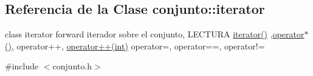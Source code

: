 \hypertarget{classconjunto_1_1iterator}{\subsection{Referencia de la Clase conjunto\-:\-:iterator}
\label{classconjunto_1_1iterator}
}


class iterator forward iterador sobre el conjunto, L\-E\-C\-T\-U\-R\-A \hyperlink{classconjunto_1_1iterator_ae3ade272e78f6888c39ad44a8b4b152a}{iterator()} ,\hyperlink{classconjunto_1_1iterator_af2e4902c07e0f553fd69a1d1ebf00529}{operator$\ast$()}, operator++, \hyperlink{classconjunto_1_1iterator_af678148966f3d71b566a390e453f401d}{operator++(int)} operator=, operator==, operator!=  




{\ttfamily \#include $<$conjunto.\-h$>$}

